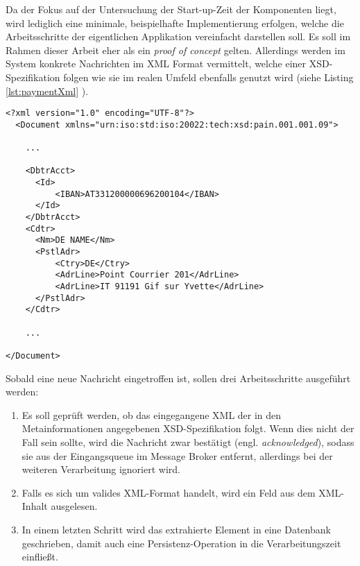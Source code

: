 Da der Fokus auf der Untersuchung der Start-up-Zeit der Komponenten liegt, wird lediglich eine minimale, beispielhafte Implementierung erfolgen, welche die Arbeitsschritte der eigentlichen Applikation vereinfacht darstellen soll. Es soll im Rahmen dieser Arbeit eher als ein \emph{proof of concept} gelten. Allerdings werden im System konkrete Nachrichten im XML Format vermittelt, welche einer XSD-Spezifikation folgen wie sie im realen Umfeld ebenfalls genutzt wird (siehe Listing \ref{lst:paymentXml} ).

\begin{minipage}{\linewidth}
\begin{lstlisting}[style=xmlStyle,caption={Payment Format},label=lst:paymentXml]
  <?xml version="1.0" encoding="UTF-8"?>
  <Document xmlns="urn:iso:std:iso:20022:tech:xsd:pain.001.001.09">

    ...

    <DbtrAcct>
      <Id>
          <IBAN>AT331200000696200104</IBAN>
      </Id>
    </DbtrAcct>
    <Cdtr>
      <Nm>DE NAME</Nm>
      <PstlAdr>
          <Ctry>DE</Ctry>
          <AdrLine>Point Courrier 201</AdrLine>
          <AdrLine>IT 91191 Gif sur Yvette</AdrLine>
      </PstlAdr>
    </Cdtr>

    ... 

</Document>
\end{lstlisting}
\end{minipage}


Sobald eine neue Nachricht eingetroffen ist, sollen drei Arbeitsschritte ausgeführt werden:

\begin{enumerate}

  \item Es soll geprüft werden, ob das eingegangene XML der in den Metainformationen angegebenen XSD-Spezifikation folgt. Wenn dies nicht der Fall sein sollte, wird die Nachricht zwar bestätigt (engl. \emph{acknowledged}), sodass sie aus der Eingangsqueue im Message Broker entfernt, allerdings bei der weiteren Verarbeitung ignoriert wird.

  \item Falls es sich um valides XML-Format handelt, wird ein Feld aus dem XML-Inhalt ausgelesen.

  \item In einem letzten Schritt wird das extrahierte Element in eine Datenbank geschrieben, damit auch eine Persistenz-Operation in die Verarbeitungszeit einfließt.

\end{enumerate}

